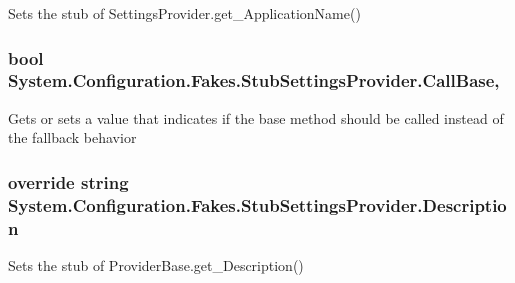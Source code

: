 Sets the stub of Settings\-Provider.\-get\-\_\-\-Application\-Name()

\hypertarget{class_system_1_1_configuration_1_1_fakes_1_1_stub_settings_provider_a50cc808fb724409623550341b8d2cee6}{
\subsubsection[{Call\-Base}]{\setlength{\rightskip}{0pt plus 5cm}bool System.\-Configuration.\-Fakes.\-Stub\-Settings\-Provider.\-Call\-Base\hspace{0.3cm}{\ttfamily [get]}, {\ttfamily [set]}}}\label{class_system_1_1_configuration_1_1_fakes_1_1_stub_settings_provider_a50cc808fb724409623550341b8d2cee6}


Gets or sets a value that indicates if the base method should be called instead of the fallback behavior

\hypertarget{class_system_1_1_configuration_1_1_fakes_1_1_stub_settings_provider_aa268c452e2abe264df670659420ed408}{
\subsubsection[{Description}]{\setlength{\rightskip}{0pt plus 5cm}override string System.\-Configuration.\-Fakes.\-Stub\-Settings\-Provider.\-Description\hspace{0.3cm}{\ttfamily [get]}}}\label{class_system_1_1_configuration_1_1_fakes_1_1_stub_settings_provider_aa268c452e2abe264df670659420ed408}


Sets the stub of Provider\-Base.\-get\-\_\-\-Description()

